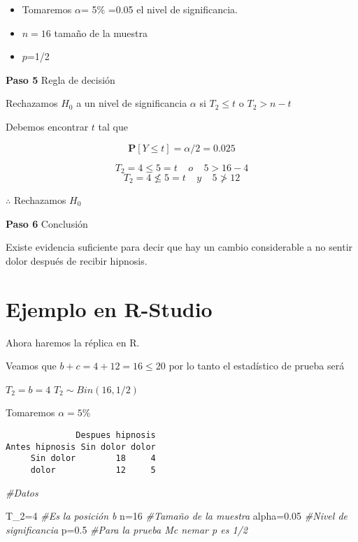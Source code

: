 \documentclass[
  a4paper,
  oneside,
  openany]{book}
\newenvironment{Shaded}{\begin{snugshade}}{\end{snugshade}}
\newcommand{\CommentTok}[1]{\textcolor[rgb]{0.56,0.35,0.01}{\textit{#1}}}
\newcommand{\DecValTok}[1]{\textcolor[rgb]{0.00,0.00,0.81}{#1}}
\newcommand{\FloatTok}[1]{\textcolor[rgb]{0.00,0.00,0.81}{#1}}
\newcommand{\NormalTok}[1]{#1}
\newcommand{\OtherTok}[1]{\textcolor[rgb]{0.56,0.35,0.01}{#1}}
\begin{document}
\begin{itemize}
\item
  Tomaremos \(\alpha\)= 5\% =0.05 el nivel de significancia.
\item
  \(n=16\) tamaño de la muestra
\item
  \(p\)=1/2
\end{itemize}

\textbf{Paso 5} Regla de decisión

Rechazamos \(H_0\) a un nivel de significancia \(\alpha\) si \(T_{2} \leq t\) o \(T_{2}>n-t\)

Debemos encontrar \(t\) tal que

\[\mathbf{P}[Y \leq t]=\alpha/2=0.025\]

\[T_{2}=4 \leq 5=t  \ \ \ \ \   o  \ \ \ \ \      5>16-4  \]
\[T_{2}=4 \nleq 5=t   \ \ \ \ \   y   \ \ \ \ \      5\ngtr12\]

\(\therefore\) Rechazamos \(H_0\)

\textbf{Paso 6} Conclusión

Existe evidencia suficiente para decir que hay un cambio considerable a no sentir dolor después de recibir hipnosis.

\hypertarget{ejemplo-en-r-studio-3}{%
\section{Ejemplo en R-Studio}\label{ejemplo-en-r-studio-3}}

Ahora haremos la réplica en R.

Veamos que \(b+c=4+12=16\leq 20\) por lo tanto el estadístico de prueba será

\(T_2=b=4\)
\(T_2\sim Bin(16,1/2)\)

Tomaremos \(\alpha=5\%\)

\begin{verbatim}
              Despues hipnosis
Antes hipnosis Sin dolor dolor
     Sin dolor        18     4
     dolor            12     5
\end{verbatim}

\begin{Shaded}
\begin{Highlighting}[]
\CommentTok{\#Datos}

\NormalTok{T\_2}\OtherTok{=}\DecValTok{4}                    \CommentTok{\#Es la posición b}
\NormalTok{n}\OtherTok{=}\DecValTok{16}                     \CommentTok{\#Tamaño de la muestra}
\NormalTok{alpha}\OtherTok{=}\FloatTok{0.05}               \CommentTok{\#Nivel de significancia}
\NormalTok{p}\OtherTok{=}\FloatTok{0.5}                    \CommentTok{\#Para la prueba Mc nemar p es 1/2}
\end{Highlighting}
\end{Shaded}
\end{document}
